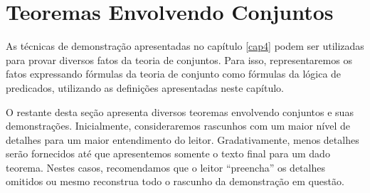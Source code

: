 \section{Teoremas Envolvendo Conjuntos}

As técnicas de demonstração apresentadas no capítulo \ref{cap4} podem
ser utilizadas para provar diversos fatos da teoria de conjuntos. Para
isso, representaremos os fatos expressando fórmulas da teoria de
conjunto como fórmulas da lógica de predicados, utilizando as definições
apresentadas neste capítulo.

O restante desta seção apresenta diversos teoremas envolvendo
conjuntos e suas demonstrações. Inicialmente, consideraremos rascunhos
com um maior nível de detalhes para um maior entendimento do
leitor. Gradativamente, menos detalhes serão fornecidos até que
apresentemos somente o texto final para um dado teorema. Nestes casos,
recomendamos que o leitor ``preencha'' os detalhes omitidos ou mesmo
reconstrua todo o rascunho da demonstração em questão.

